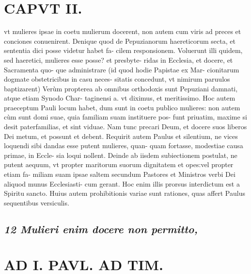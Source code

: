 \documentclass{article}
\begin{document}
\begin{pages}
\section*{CAPVT II. }
\marginpar{[ p.83 ]}vt mulieres ipsae in coetu mulierum docerent, non autem cum viris ad preces et conciones conuenirent. \pstart Denique quod de Pepuzianorum haereticorum secta, et sententia dici posse videtur habet fa- cilem responsionem. Voluerunt illi quidem, sed haeretici, mulieres esse posse? et presbyte- ridas in Ecclesia, et docere, et Sacramenta quo- que administrare (id quod hodie Papistae ex Mar- cionitarum dogmate obstetricibus in casu neces- sitatis concedunt, vt nimirum paruulos baptizarent) Verùm propterea ab omnibus orthodoxis sunt Pepuziani damnati, atque etiam Synodo Char- taginensi a. vt diximus, et meritissimo.  \pend\pstart Hoc autem praeceptum Pauli locum habet, dum sunt in coetu publico mulieres: non autem cùm sunt domi suae, quia familiam suam instituere pos- funt priuatim, maxime si desit paterfamilias, et sint viduae. Nam tunc precari Deum, et docere suos liberos Dei metum, et possunt et debent.  \pend\pstart Requirit autem Paulus et silentium, ne vices loquendi sibi dandas esse putent mulieres, quan- quam fortasse, modestiae causa primae, in Eccle- sia loqui nollent. Deinde ab iisdem subiectionem postulat, ne putent aequum, vt propter maritorum suorum dignitatem et opes:vel propter etiam fa- miliam suam ipsae saltem secundum Pastores et Ministros verbi Dei aliquod munus Ecclesiasti- cum gerant. Hoc enim illis prorsus interdictum est a Spiritu sancto. Huius autem prohibitionis variae sunt rationes, quas affert Paulus sequentibus  versiculis.  \pend
{}
{}
\subsection*{\textit{12 Mulieri enim docere non permitto, }}
\section*{AD I. PAVL. AD TIM. }
\marginpar{[ p.84 ]}
{}

\end{pages}
\end{document}
